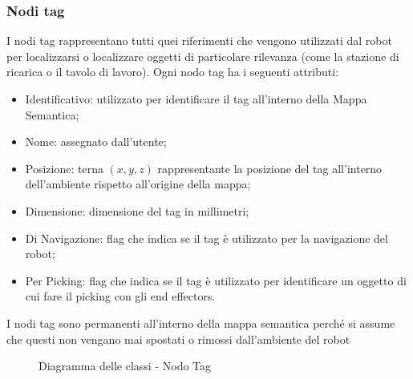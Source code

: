 \subsubsection{Nodi tag}
I nodi tag rappresentano tutti quei riferimenti che vengono utilizzati dal robot per localizzarsi o localizzare oggetti di particolare rilevanza (come la stazione di ricarica o il tavolo di lavoro). Ogni nodo tag ha i seguenti attributi:
\begin{itemize}
  \item Identificativo: utilizzato per identificare il tag all'interno della Mappa Semantica;
  \item Nome: assegnato dall'utente;
  \item Posizione: terna $(x, y, z)$ rappresentante la posizione del tag all'interno dell'ambiente rispetto all'origine della mappa;
  \item Dimensione: dimensione del tag in millimetri;
  \item Di Navigazione: flag che indica se il tag è utilizzato per la navigazione del robot;
  \item Per Picking: flag che indica se il tag è utilizzato per identificare un oggetto di cui fare il picking con gli end effectors.
\end{itemize}
I nodi tag sono permanenti all'interno della mappa semantica perché si assume che questi non vengano mai spostati o rimossi dall'ambiente del robot

\begin{figure}[h]
  \centering
  \caption{Diagramma delle classi - Nodo Tag}
\end{figure}

